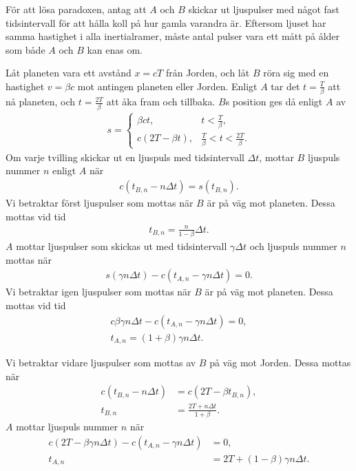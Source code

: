 För att lösa paradoxen, antag att $A$ och $B$ skickar ut ljuspulser med något fast tidsintervall för att hålla koll på hur gamla varandra är. Eftersom ljuset har samma hastighet i alla inertialramer, måste antal pulser vara ett mått på ålder som både $A$ och $B$ kan enas om.

Låt planeten vara ett avstånd $x = cT$ från Jorden, och låt $B$ röra sig med en hastighet $v = \beta c$ mot antingen planeten eller Jorden. Enligt $A$ tar det $t = \frac{T}{\beta}$ att nå planeten, och $t = \frac{2T}{\beta}$ att åka fram och tillbaka. $B$s position ges då enligt $A$ av
\begin{align*}
	s =
	\begin{cases}
		\beta ct,       &t < \frac{T}{\beta}, \\
		c(2T - \beta t), &\frac{T}{\beta} < t < \frac{2T}{\beta}.
	\end{cases}
\end{align*}
Om varje tvilling skickar ut en ljuspuls med tidsintervall $\Delta t$, mottar $B$ ljuspuls nummer $n$ enligt $A$ när
\begin{align*}
	c(t_{B, n} - n\Delta t) = s(t_{B, n}).
\end{align*}
Vi betraktar först ljuspulser som mottas när $B$ är på väg mot planeten. Dessa mottas vid tid
\begin{align*}
	t_{B, n} = \frac{n}{1 - \beta}\Delta t. 
\end{align*}
$A$ mottar ljuspulser som skickas ut med tidsintervall $\gamma\Delta t$ och ljuspuls nummer $n$ mottas när
\begin{align*}
	s(\gamma n\Delta t) - c(t_{A, n} - \gamma n\Delta t) = 0.
\end{align*}
Vi betraktar igen ljuspulser som mottas när $B$ är på väg mot planeten. Dessa mottas vid tid
\begin{align*}
	c\beta\gamma n\Delta t - c(t_{A, n} - \gamma n\Delta t) = 0, \\
	t_{A, n} = (1 + \beta)\gamma n\Delta t.
\end{align*}

Vi betraktar vidare ljuspulser som mottas av $B$ på väg mot Jorden. Dessa mottas när
\begin{align*}
	c(t_{B, n} - n\Delta t) &= c(2T - \beta t_{B, n}), \\
	t_{B, n}                &= \frac{2T + n\Delta t}{1 + \beta}.
\end{align*}
$A$ mottar ljuspuls nummer $n$ när
\begin{align*}
	c(2T - \beta\gamma n\Delta t) - c(t_{A, n} - \gamma n\Delta t) &= 0, \\
	t_{A, n}                                                        &= 2T + (1 - \beta)\gamma n\Delta t.
\end{align*}

